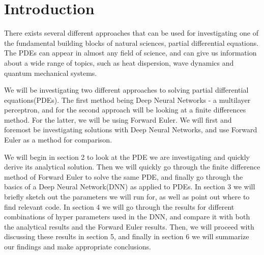 \section{Introduction}
There exists several different approaches that can be used for investigating one of the fundamental building blocks of natural sciences, partial differential equations. The PDEs can appear in almost any field of science, and can give us information about a wide range of topics, such as heat dispersion, wave dynamics and quantum mechanical systems\citep[see][ch. 10]{hjorth-jensen_computational_2015}.

We will be investigating two different approaches to solving partial differential equations(PDEs). The first method being Deep Neural Networks - a multilayer perceptron, and for the second approach will be looking at a finite differences method. For the latter, we will be using Forward Euler. We will first and foremost be investigating solutions with Deep Neural Networks, and use Forward Euler as a method for comparison.

We will begin in section 2 to look at the PDE we are investigating and quickly derive its analytical solution. Then we will quickly go through the finite difference method of Forward Euler to solve the same PDE, and finally go through the basics of a Deep Neural Network(DNN) as applied to PDEs. In section 3 we will briefly sketch out the parameters we will run for, as well as point out where to find relevant code. In section 4 we will go through the results for different combinations of hyper parameters used in the DNN, and compare it with both the analytical results and the Forward Euler results. Then, we will proceed with discussing these results in section 5, and finally in section 6 we will summarize our findings and make appropriate conclusions.